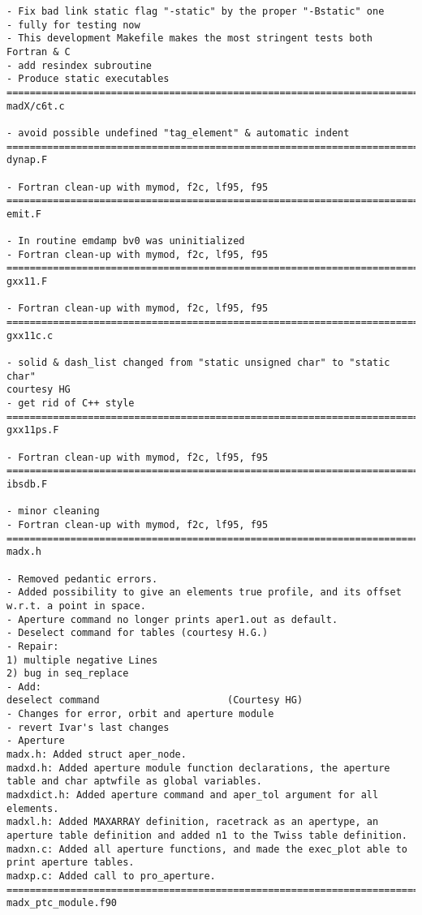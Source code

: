 \begin{verbatim}
- Fix bad link static flag "-static" by the proper "-Bstatic" one
- fully for testing now
- This development Makefile makes the most stringent tests both Fortran & C
- add resindex subroutine
- Produce static executables
=============================================================================
madX/c6t.c

- avoid possible undefined "tag_element" & automatic indent
=============================================================================
dynap.F

- Fortran clean-up with mymod, f2c, lf95, f95
=============================================================================
emit.F

- In routine emdamp bv0 was uninitialized
- Fortran clean-up with mymod, f2c, lf95, f95
=============================================================================
gxx11.F

- Fortran clean-up with mymod, f2c, lf95, f95
=============================================================================
gxx11c.c

- solid & dash_list changed from "static unsigned char" to "static char"
courtesy HG
- get rid of C++ style
=============================================================================
gxx11ps.F

- Fortran clean-up with mymod, f2c, lf95, f95
=============================================================================
ibsdb.F

- minor cleaning
- Fortran clean-up with mymod, f2c, lf95, f95
=============================================================================
madx.h

- Removed pedantic errors.
- Added possibility to give an elements true profile, and its offset
w.r.t. a point in space.
- Aperture command no longer prints aper1.out as default.
- Deselect command for tables (courtesy H.G.)
- Repair:
1) multiple negative Lines
2) bug in seq_replace
- Add:
deselect command                      (Courtesy HG)
- Changes for error, orbit and aperture module
- revert Ivar's last changes
- Aperture
madx.h: Added struct aper_node.
madxd.h: Added aperture module function declarations, the aperture
table and char aptwfile as global variables.
madxdict.h: Added aperture command and aper_tol argument for all elements.
madxl.h: Added MAXARRAY definition, racetrack as an apertype, an
aperture table definition and added n1 to the Twiss table definition.
madxn.c: Added all aperture functions, and made the exec_plot able to
print aperture tables.
madxp.c: Added call to pro_aperture.
=============================================================================
madx_ptc_module.f90


\end{verbatim}
